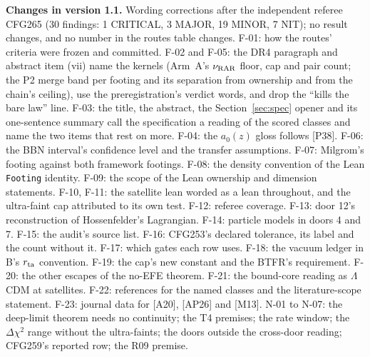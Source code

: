 \documentclass[10pt]{article}
\begin{document}
\textbf{Changes in version 1.1.} Wording corrections after the independent referee CFG265 (30 findings: 1 CRITICAL, 3 MAJOR, 19 MINOR, 7 NIT); no result changes, and no number in the routes table changes. F-01: how the routes' criteria were frozen and committed. F-02 and F-05: the DR4 paragraph and abstract item (vii) name the kernels (Arm~A's $\nu_{\rm RAR}$ floor, cap and pair count; the P2 merge band per footing and its separation from ownership and from the chain's ceiling), use the preregistration's verdict words, and drop the ``kills the bare law'' line. F-03: the title, the abstract, the Section~\ref{sec:spec} opener and its one-sentence summary call the specification a reading of the scored classes and name the two items that rest on more. F-04: the $a_0(z)$ gloss follows [P38]. F-06: the BBN interval's confidence level and the transfer assumptions. F-07: Milgrom's footing against both framework footings. F-08: the density convention of the Lean \texttt{Footing} identity. F-09: the scope of the Lean ownership and dimension statements. F-10, F-11: the satellite lean worded as a lean throughout, and the ultra-faint cap attributed to its own test. F-12: referee coverage. F-13: door 12's reconstruction of Hossenfelder's Lagrangian. F-14: particle models in doors 4 and 7. F-15: the audit's source list. F-16: CFG253's declared tolerance, its label and the count without it. F-17: which gates each row uses. F-18: the vacuum ledger in B's $r_{\rm ta}$ convention. F-19: the cap's new constant and the BTFR's requirement. F-20: the other escapes of the no-EFE theorem. F-21: the bound-core reading as $\Lambda$CDM at satellites. F-22: references for the named classes and the literature-scope statement. F-23: journal data for [A20], [AP26] and [M13]. N-01 to N-07: the deep-limit theorem needs no continuity; the T4 premises; the rate window; the $\Delta\chi^2$ range without the ultra-faints; the doors outside the cross-door reading; CFG259's reported row; the R09 premise.
\end{document}
